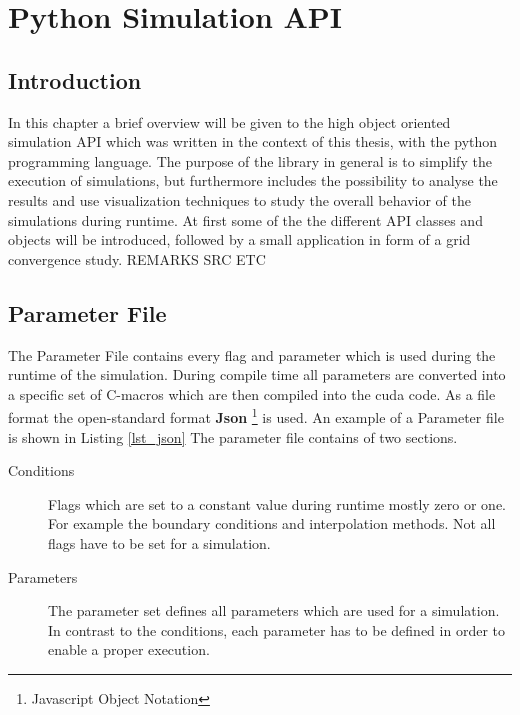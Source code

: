 \chapter{Python Simulation API}

\section{Introduction}

In this chapter a brief overview will be given to the high object oriented simulation API which
was written in the context of this thesis, with the python programming language.
The purpose of the library in general is to simplify the execution of simulations, but furthermore
includes the possibility to analyse the results and use visualization techniques to study the overall
behavior of the simulations during runtime.
At first some of the the different API classes and objects will be introduced,
followed by a small application in form of a grid convergence study.
REMARKS SRC ETC

\section{Parameter File}

The Parameter File contains every flag and parameter which is used during the runtime of the simulation.
During compile time all parameters are converted into a specific set of C-macros which are then compiled
into the cuda code. As a file format the open-standard format \textbf{Json} \footnote{Javascript Object Notation} is used.
An example of a Parameter file is shown in Listing \ref{lst_json}
The parameter file contains of two sections.

\begin{description}
\item[Conditions] Flags which are set to a constant value during runtime mostly zero or one. For example the boundary conditions and
                  interpolation methods. Not all flags have to be set for a simulation.
\item[Parameters] The parameter set defines all parameters which are used  for a simulation. In contrast to the conditions, each
                  parameter has to be defined in order to enable a proper execution.
\end{description}

